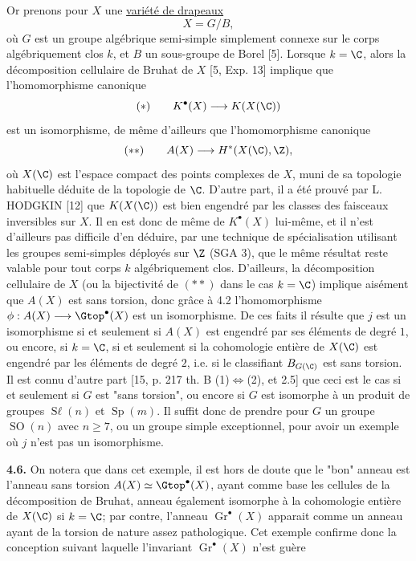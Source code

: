 
Or
prenons pour $X$ une \uline{variété de drapeaux}
\[
 X=G/B,
\]
où $G$ est un groupe algébrique semi-simple simplement connexe sur le corps algébriquement clos $k$, et $B$ un sous-groupe de Borel [5]. Lorsque $k=\C$, alors la décomposition cellulaire de Bruhat de $X$ [5, Exp. 13] implique que l'homomorphisme canonique
\[
 (*)\qquad K^\bullet(X)\longrightarrow K(X(\C))
\]
est un isomorphisme, de même d'ailleurs que l'homomorphisme canonique
\[
 (**)\qquad A(X)\longrightarrow H^*(X(\C),\Z),
\]
où $X(\C)$ est l'espace compact des points complexes de $X$, muni de sa topologie habituelle déduite de la topologie de $\C$. D'autre part, il a été prouvé par L. HODGKIN [12] que $K(X(\C))$ est bien engendré par les classes des faisceaux inversibles sur $X$. Il en est donc de même de $K^\bullet(X)$ lui-même, et il n'est d'ailleurs pas difficile d'en déduire, par une technique de spécialisation utilisant les groupes semi-simples déployés sur $\Z$ (SGA 3), que le même résultat reste valable pour tout corps $k$ algébriquement clos. D'ailleurs, la décomposition cellulaire de $X$ (ou la bijectivité de $(**)$ dans le cas $k=\C$) implique aisément que $A(X)$ est sans torsion, donc grâce à 4.2 l'homomorphisme $\phi:A(X)\longrightarrow\Gtop^\bullet(X)$ est un isomorphisme. De ces faits il résulte que $j$ est un isomorphisme si et seulement si $A(X)$ est engendré par ses éléments de degré $1$, ou encore, si $k=\C$, si et seulement si la cohomologie entière de $X(\C)$ est engendré par les éléments de degré $2$, i.e. si le classifiant $B_{G(\C)}$ est sans torsion. Il est connu d'autre part [15, p. 217 th. B (1)$\Leftrightarrow$(2), et 2.5] que ceci est le cas si et seulement si $G$ est "sans torsion", ou encore si $G$ est isomorphe à un produit de groupes $\operatorname{S\ell}(n)$ et $\operatorname{Sp}(m)$. Il suffit donc de prendre pour $G$ un groupe $\operatorname{SO}(n)$ avec $n\geq 7$, ou un groupe simple exceptionnel, pour avoir un exemple où $j$ n'est pas un isomorphisme.

\textbf{4.6.} On notera que dans cet exemple, il est hors de doute que le "bon" anneau est l'anneau sans torsion $A(X)\simeq\Gtop^\bullet(X)$, ayant comme base les cellules de la décomposition de Bruhat, anneau également isomorphe à la cohomologie entière de $X(\C)$ si $k=\C$; par contre, l'anneau $\operatorname{Gr}^\bullet(X)$ apparait comme un anneau ayant de la torsion de nature assez pathologique. Cet exemple confirme donc la conception suivant laquelle l'invariant $\operatorname{Gr}^\bullet(X)$ n'est guère
